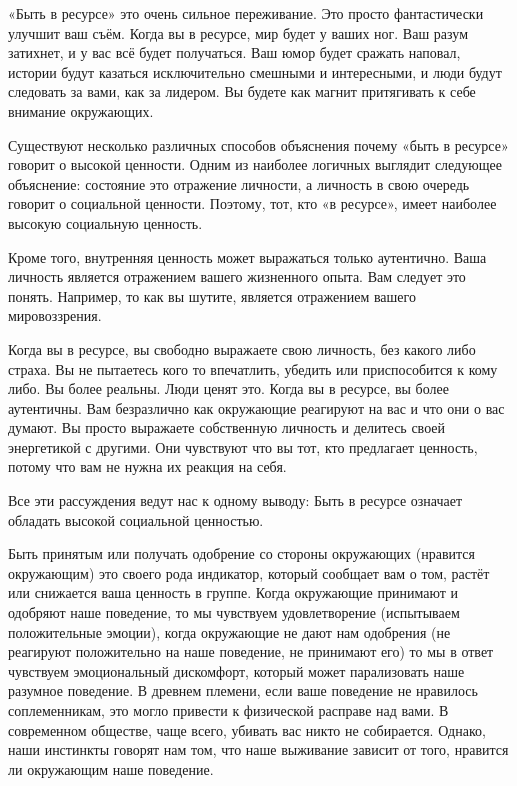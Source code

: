 «Быть в ресурсе» это очень сильное переживание. Это просто фантастически улучшит ваш съём. Когда вы в ресурсе, мир будет у ваших ног. Ваш разум затихнет, и у вас всё будет получаться. Ваш юмор будет сражать наповал, истории будут казаться исключительно смешными и интересными, и люди будут следовать за вами, как за лидером. Вы будете как магнит притягивать к себе внимание окружающих.

Существуют несколько различных способов объяснения почему «быть в ресурсе» говорит о высокой ценности. Одним из наиболее логичных выглядит следующее объяснение: состояние это отражение личности, а личность в свою очередь говорит о социальной ценности. Поэтому, тот, кто «в ресурсе», имеет наиболее высокую социальную ценность.

Кроме того, внутренняя ценность может выражаться только аутентично. Ваша личность является отражением вашего жизненного опыта. Вам следует это понять. Например, то как вы шутите, является отражением вашего мировоззрения.

Когда вы в ресурсе, вы свободно выражаете свою личность, без какого либо страха. Вы не пытаетесь кого то впечатлить, убедить или приспособится к кому либо. Вы более реальны. Люди ценят это. Когда вы в ресурсе, вы более аутентичны. Вам безразлично как окружающие реагируют на вас и что они о вас думают. Вы просто выражаете собственную личность и делитесь своей энергетикой с другими. Они чувствуют что вы тот, кто предлагает ценность, потому что вам не нужна их реакция на себя.

Все эти рассуждения ведут нас к одному выводу: Быть в ресурсе означает обладать высокой социальной ценностью.

Быть принятым или получать одобрение со стороны окружающих (нравится окружающим) это своего рода индикатор, который сообщает вам о том, растёт или снижается ваша ценность в группе. Когда окружающие принимают и одобряют наше поведение, то мы чувствуем удовлетворение (испытываем положительные эмоции), когда окружающие не дают нам одобрения (не реагируют положительно на наше поведение, не принимают его) то мы в ответ чувствуем эмоциональный дискомфорт, который может парализовать наше разумное поведение. В древнем племени, если ваше поведение не нравилось соплеменникам, это могло привести к физической расправе над вами. В современном обществе, чаще всего, убивать вас никто не собирается. Однако, наши инстинкты говорят нам том, что наше выживание зависит от того, нравится ли окружающим наше поведение.

